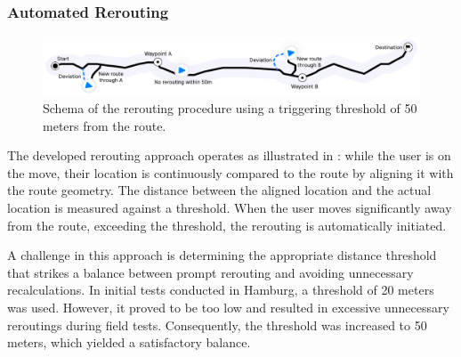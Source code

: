 \subsubsection{Automated Rerouting}

\begin{figure}[t]
\centering
\includegraphics[width=\linewidth]{images/rerouting-strategy.pdf}
\caption{Schema of the rerouting procedure using a triggering threshold of 50 meters from the route.}
\label{fig:rerouting-strategy}
\end{figure}

The developed rerouting approach operates as illustrated in : while the user is on the move, their location is continuously compared to the route by aligning it with the route geometry. The distance between the aligned location and the actual location is measured against a threshold. When the user moves significantly away from the route, exceeding the threshold, the rerouting is automatically initiated. 

A challenge in this approach is determining the appropriate distance threshold that strikes a balance between prompt rerouting and avoiding unnecessary recalculations. In initial tests conducted in Hamburg, a threshold of 20 meters was used. However, it proved to be too low and resulted in excessive unnecessary reroutings during field tests. Consequently, the threshold was increased to 50 meters, which yielded a satisfactory balance.

